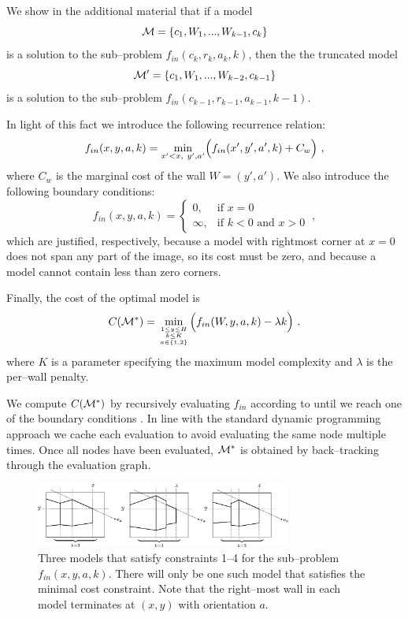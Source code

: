 We show in the additional material that if a model
\begin{equation}
  \mathcal{M}=\{c_1,W_1,...,W_{k-1},c_k\}
\end{equation}
is a solution to the sub--problem $f_{in}(c_k,r_k,a_k,k)$, then the the
truncated model
\begin{equation}
  \mathcal{M}'=\{c_1,W_1,...,W_{k-2},c_{k-1}\}
\end{equation}
is a solution to the sub--problem $f_{in}(c_{k-1}, r_{k-1}, a_{k-1},
k-1)$.

In light of this fact we introduce the following recurrence relation:
\begin{equation}
  \label{eq:fin-recurrence-first}
  f_{in}(x,y,a,k) = \min_{x'<x,~y',a'} \Bigl( f_{in}(x',y',a',k) +
  C_w \Bigr) ~,
\end{equation}
where $C_w$ is the marginal cost of the wall $W=(y',a')$. We also
introduce the following boundary conditions:
\begin{equation}
  \label{eq:fin-base}
  f_{in}(x,y,a,k) =
  \begin{cases}
    0, & \mbox{if } x=0 \\
    \infty, & \mbox{if } k<0 \mbox{ and } x>0
  \end{cases}
  ~,
\end{equation}
which are justified, respectively, because a model with rightmost
corner at $x=0$ does not span any part of the image, so its cost must
be zero, and because a model cannot contain less than zero corners.

Finally, the cost of the optimal model  is
\begin{equation}
  \label{eq:opt-entry-point}
  C(\mathcal{M}^*) = 
  \min_{{1\leq y \leq H \atop k \leq K} \atop a\in\{1,2\}}
  \Bigl( f_{in}(W,y,a,k) - \lambda k \Bigr) ~.
\end{equation}
where $K$ is a parameter specifying the maximum model complexity and
$\lambda$ is the per--wall penalty.

We compute $C(\mathcal{M}^*)$ by recursively evaluating $f_{in}$
according to  until we reach one of the
boundary conditions . In line with the standard
dynamic programming approach we cache each evaluation to avoid
evaluating the same node multiple times. Once all nodes have been
evaluated, $\mathcal{M}^*$ is obtained by back--tracking through the
evaluation graph.

\begin{figure}[tb]
\centering
\includegraphics[width=0.75\textwidth]{figures/fin-hypotheses}
\caption{Three models that satisfy constraints 1--4 for the
  sub--problem $f_{in}(x,y,a,k)$. There will only be one such model
  that satisfies the minimal cost constraint. Note that the
  right--most wall in each model terminates at $(x,y)$ with
  orientation $a$.}
\label{fig:fin-egs}
\end{figure}

